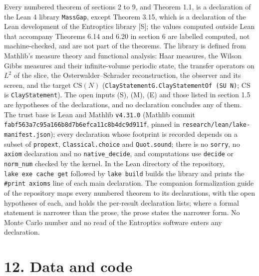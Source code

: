\documentclass[10pt,letterpaper,twocolumn]{article}
\begin{document}
Every numbered theorem of sections 2 to 9, and Theorem 1.1, is a declaration of the Lean 4 library \texttt{MassGap}, except Theorem 3.15, which is a declaration of the Lean development of the Entroptics library {[}S{]}; the values computed outside Lean that accompany Theorems 6.14 and 6.20 in section 6 are labelled computed, not machine-checked, and are not part of the theorems. The library is defined from Mathlib's measure theory and functional analysis: Haar measures, the Wilson Gibbs measures and their infinite-volume periodic state, the transfer operators on \(L^2\) of the slice, the Osterwalder--Schrader reconstruction, the observer and its screen, and the target \(\mathrm{CS}(N)\) (\texttt{ClayStatementG.\allowbreak{}ClayStatementOf\ (\allowbreak{}SU\ N)\allowbreak{}}; \(\mathrm{CS}\) is \texttt{ClayStatement}). The open inputs (S), (M), (E) and those listed in section 1.5 are hypotheses of the declarations, and no declaration concludes any of them. The trust base is Lean and Mathlib \texttt{v4.\allowbreak{}31.\allowbreak{}0} (Mathlib commit \texttt{fabf563a7c95a166b8d7b6efca11c8b4dc9d911f}, pinned in \texttt{research/\allowbreak{}lean/\allowbreak{}lake-{}\allowbreak{}manifest.\allowbreak{}json}); every declaration whose footprint is recorded depends on a subset of \texttt{propext}, \texttt{Classical.\allowbreak{}choice} and \texttt{Quot.\allowbreak{}sound}; there is no \texttt{sorry}, no \texttt{axiom} declaration and no \texttt{native\_\allowbreak{}decide}, and computations use \texttt{decide} or \texttt{norm\_\allowbreak{}num} checked by the kernel. In the Lean directory of the repository, \texttt{lake\ exe\ cache\ get} followed by \texttt{lake\ build} builds the library and prints the \texttt{\#print\ axioms} line of each main declaration. The companion formalization guide of the repository maps every numbered theorem to its declarations, with the open hypotheses of each, and holds the per-result declaration lists; where a formal statement is narrower than the prose, the prose states the narrower form. No Monte Carlo number and no read of the Entroptics software enters any declaration.

\section{12. Data and code}\label{12-data-and-code}
\end{document}
